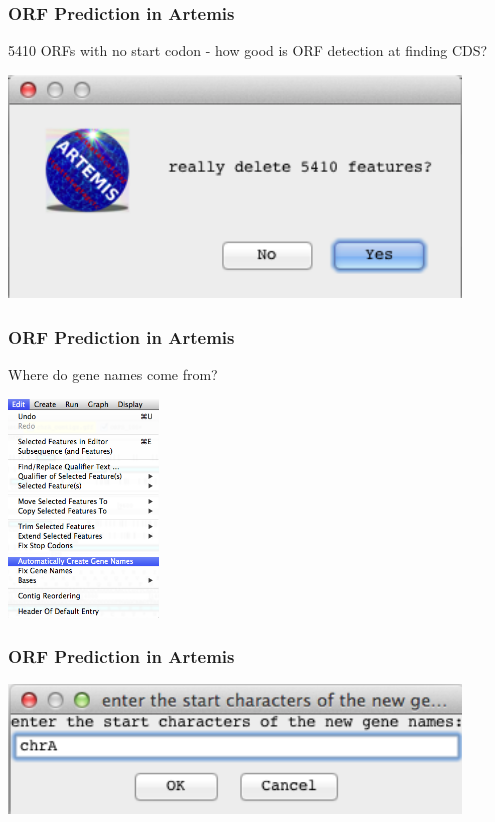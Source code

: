 \documentclass[table]{beamer}
\begin{document}
    \begin{frame}
      \frametitle{ORF Prediction in Artemis} 
      5410 ORFs with no start codon - how good is ORF detection at finding CDS?
      \begin{center}
        \includegraphics[width=0.9\textwidth]{images/artemis_orf11}     
      \end{center}
    \end{frame} 

    \begin{frame}
      \frametitle{ORF Prediction in Artemis}
      Where do gene names come from?
      \begin{center}
        \includegraphics[width=0.3\textwidth]{images/artemis_orf12}     
      \end{center}
    \end{frame} 

    \begin{frame}
      \frametitle{ORF Prediction in Artemis}    
      \begin{center}
        \includegraphics[width=0.9\textwidth]{images/artemis_orf13}     
      \end{center}
    \end{frame} 
\end{document}
